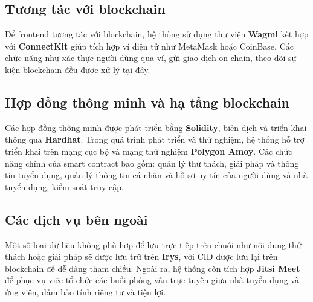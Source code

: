 \subsection{Tương tác với blockchain}

Để frontend tương tác với blockchain, hệ thống sử dụng thư viện \textbf{Wagmi} kết hợp với \textbf{ConnectKit} giúp tích hợp ví điện tử như MetaMask hoặc CoinBase.  
Các chức năng như xác thực người dùng qua ví, gửi giao dịch on-chain, theo dõi sự kiện blockchain đều được xử lý tại đây.

\subsection{Hợp đồng thông minh và hạ tầng blockchain}

Các hợp đồng thông minh được phát triển bằng \textbf{Solidity}, biên dịch và triển khai thông qua \textbf{Hardhat}. Trong quá trình phát triển và thử nghiệm, hệ thống hỗ trợ triển khai trên mạng cục bộ và mạng thử nghiệm \textbf{Polygon Amoy}.  
Các chức năng chính của smart contract bao gồm: quản lý thử thách, giải pháp và thông tin tuyển dụng, quản lý thông tin cá nhân và hồ sơ uy tín của người dùng và nhà tuyển dụng, kiểm soát truy cập.

\subsection{Các dịch vụ bên ngoài}

Một số loại dữ liệu không phù hợp để lưu trực tiếp trên chuỗi như nội dung thử thách hoặc giải pháp sẽ được lưu trữ trên \textbf{Irys}, với CID được lưu lại trên blockchain để dễ dàng tham chiếu.  
Ngoài ra, hệ thống còn tích hợp \textbf{Jitsi Meet} để phục vụ việc tổ chức các buổi phỏng vấn trực tuyến giữa nhà tuyển dụng và ứng viên, đảm bảo tính riêng tư và tiện lợi.